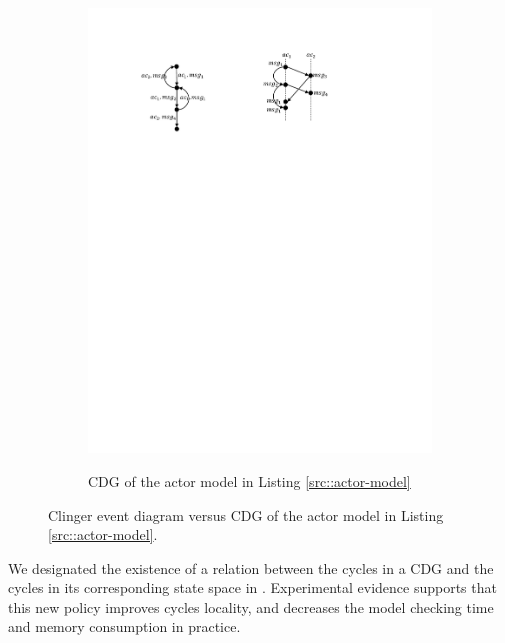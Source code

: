 \begin{figure}
\begin{subfigure}[b]{0.2\textwidth}
  \centering
  \small{
   \includegraphics[width=.8\textwidth]{resources/cdg.pdf}
  }
  \caption{CDG of the actor model in Listing \ref{src::actor-model}}
  \label{fig::cdg}
\end{subfigure}
\caption{Clinger event diagram versus CDG of the actor model in Listing \ref{src::actor-model}.}
\label{fig::clinger-cdg}
\end{figure}

We designated 
the existence of a relation between the cycles in a CDG and the cycles in its corresponding state space in \cite{DBLP:journals/eceasst/KhamespanahSMSR15}. 
%
Experimental evidence supports that this new policy improves cycles locality, and decreases the model checking time and memory consumption in practice.

